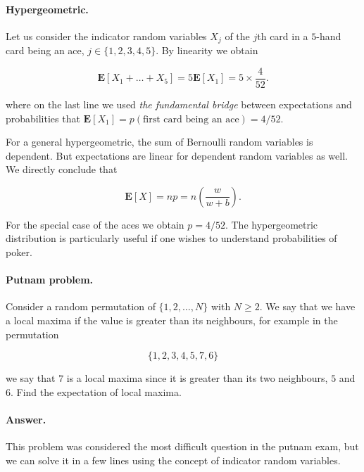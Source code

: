 \documentclass[12pt]{article}
\begin{document}
\paragraph{Hypergeometric.}
Let us consider the indicator random variables $X_{j}$ of the $j$th card
in a $5$-hand card being an ace, $j \in \{1,2,3,4,5\}$.
By linearity we obtain

\begin{equation}
\mathbf{E} [ X_{1} + \ldots + X_{5} ] =
5 \mathbf{E} [ X_{1} ] = 5 \times \frac{4}{52}.
\end{equation}

\noindent
where on the last line we used \textit{the fundamental bridge} between
expectations and probabilities that $\mathbf{E} [X_{1}] =
p( \text{first card being an ace} ) = 4 / 52$.

For a general hypergeometric, the sum of Bernoulli random variables is dependent.
But expectations are linear for dependent random variables as well.
We directly conclude that

\begin{equation}
\mathbf{E} [ X ] = 
n p = n \left( \frac{w}{w + b} \right).
\end{equation}

\noindent
For the special case of the aces we obtain $p = 4/52$.
The hypergeometric distribution is particularly useful if one
wishes to understand probabilities of poker.

\paragraph{Putnam problem.}
Consider a random permutation of $\{1, 2, \ldots, N\}$ with $N \geq 2$.
We say that we have a local maxima if the value is greater than its neighbours,
for example in the permutation

\begin{equation}
\{1, 2, 3, 4, 5, 7, 6\}
\end{equation}

\noindent
we say that $7$ is a local maxima since it is greater than its two neighbours,
$5$ and $6$.
Find the expectation of local maxima.

\paragraph{Answer.}
This problem was considered the most difficult question in the putnam exam, but
we can solve it in a few lines using the concept of 
indicator random variables.
\end{document}
